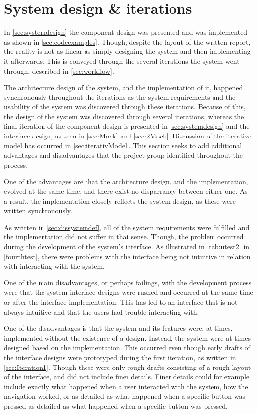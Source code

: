\section{System design \& iterations}\label{sec:dissystemdes}

In \cref{sec:systemdesign} the component design was presented and was implemented as shown in \cref{sec:codeexamples}.
Though, despite the layout of the written report, the reality is not as linear as simply designing the system and then implementing it afterwards.
This is conveyed through the several iterations the system went through, described in \cref{sec:workflow}.

The architecture design of the system, and the implementation of it, happened synchronously throughout the iterations as the system requirements and the usability of the system was discovered through these iterations.
Because of this, the design of the system was discovered through several iterations, whereas the final iteration of the component design is presented in \cref{sec:systemdesign} and the interface design, as seen in \cref{sec:Mock} and \ref{sec:2Mock}.
Discussion of the iterative model has occurred in \cref{sec:iterativModel}.
This section seeks to add additional advantages and disadvantages that the project group identified throughout the process.

One of the advantages are that the architecture design, and the implementation, evolved at the same time, and there exist no disparrancy between either one.
As a result, the implementation closely reflects the system design, as these were written synchronously.

As written in \cref{sec:dissystemdef}, all of the system requirements were fulfilled and the implementation did not suffer in that sense.
Though, the problem occurred during the development of the system's interface.
As illustrated in \cref{tab:utest2} in \cref{fourthtest}, there were problems with the interface being not intuitive in relation with interacting with the system. 

One of the main disadvantages, or perhaps failings, with the development process were that the system interface designs were rushed and occurred at the same time or after the interface implementation.
This has led to an interface that is not always intuitive and that the users had trouble interacting with.

One of the disadvantages is that the system and its features were, at times, implemented without the existence of a design.
Instead, the system were at times designed based on the implementation.
This occurred even though early drafts of the interface designs were prototyped during the first iteration, as written in \cref{sec:Iteration1}.
Though these were only rough drafts consisting of a rough layout of the interface, and did not include finer details.
Finer details could for example include exactly what happened when a user interacted with the system, how the navigation worked, or as detailed as what happened when a specific button was pressed as detailed as what happened when a specific button was pressed.

